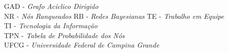 GAD     - \textit{Grafo Acíclico Dirigido}\\
NR      - \textit{Nós Ranqueados}
RB      - \textit{Redes Bayesianas}
TE      - \textit{Trabalho em Equipe}\\
TI      - \textit{Tecnologia da Informação}\\
TPN     - \textit{Tabela de Probabilidade dos Nós}\\
UFCG	- \textit{Universidade Federal de Campina Grande}
